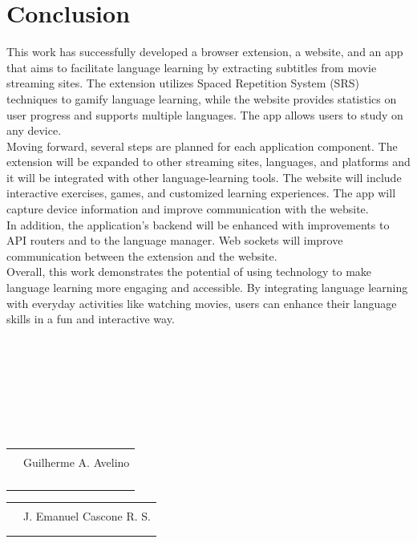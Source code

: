\documentclass[12pt]{article}
\begin{document}
\section{
Conclusion
}
This work has successfully developed a browser extension, a website, and an app that aims to facilitate language learning by extracting subtitles from movie streaming sites. The extension utilizes Spaced Repetition System (SRS) techniques to gamify language learning, while the website provides statistics on user progress and supports multiple languages. The app allows users to study on any device. \\
Moving forward, several steps are planned for each application component. The extension will be expanded to other streaming sites, languages, and platforms and it will be integrated with other language-learning tools. The website will include interactive exercises, games, and customized learning experiences. The app will capture device information and improve communication with the website. \\
In addition, the application's backend will be enhanced with improvements to API routers and to the language manager. Web sockets will improve communication between the extension and the website. \\
Overall, this work demonstrates the potential of using technology to make language learning more engaging and accessible. By integrating language learning with everyday activities like watching movies, users can enhance their language skills in a fun and interactive way.\\









\hfill \\
\hfill \\
\hfill \\
\hfill \\
\hfill \\
\hfill \\
\hfill \\
\hfill 
\centering

\begin{tabular}{@{}p{.5in}p{4in}@{}}
& \hrulefill \\
& \centerline{Guilherme A. Avelino} \\
\\ \\ \\ \\ 
\end{tabular}

\centering
\begin{tabular}{@{}p{.5in}p{4in}@{}}
& \hrulefill \\
& \centerline{J. Emanuel Cascone R. S.} \\
\\ \\
\end{tabular}
\end{document}

